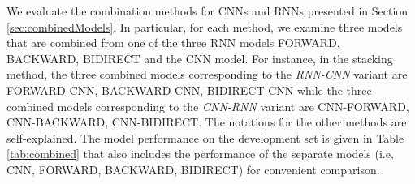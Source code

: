 \documentclass[11pt,letterpaper]{article}
\begin{document}
\begin{table*}[htbp]
\centering
{}
\caption{Performance of the Hybrid Models}
\label{tab:hybrid}
\end{table*}



We evaluate the combination methods for CNNs and RNNs presented in Section \ref{sec:combinedModels}. In particular, for each method, we examine three models that are combined from one of the three RNN models FORWARD, BACKWARD, BIDIRECT and the CNN model. For instance, in the stacking method, the three combined models corresponding to the {\it RNN-CNN}  variant are FORWARD-CNN, BACKWARD-CNN, BIDIRECT-CNN while the three combined models corresponding to the {\it CNN-RNN} variant are CNN-FORWARD, CNN-BACKWARD, CNN-BIDIRECT. The notations for the other methods are self-explained. The model performance on the development set is given in Table \ref{tab:combined} that also includes the performance of the separate models (i.e, CNN, FORWARD, BACKWARD, BIDIRECT) for convenient comparison.
\end{document}
